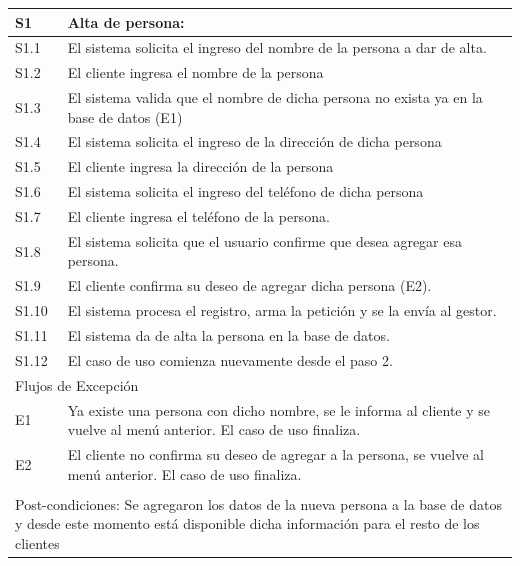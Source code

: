 \documentclass[11pt]{article}
\begin{document}
\begin{tabular}{|l|m{}|}
    S1 &  Alta de persona: \\ \hline
    S1.1 & El sistema solicita el ingreso del nombre de la persona a dar de alta.\\ \hline
    S1.2 & El cliente ingresa el nombre de la persona\\ \hline
    S1.3 & El sistema valida que el nombre de dicha persona no exista ya en la base de datos (E1) \\ \hline
    S1.4 & El sistema solicita el ingreso de la direcci\'on de dicha persona\\ \hline
    S1.5 & El cliente ingresa la direcci\'on de la persona\\ \hline
    S1.6 & El sistema solicita el ingreso del tel\'efono de dicha persona\\ \hline
    S1.7 & El cliente ingresa el tel\'efono de la persona.\\ \hline
    S1.8 & El sistema solicita que el usuario confirme que desea agregar esa persona.\\ \hline
    S1.9 & El cliente confirma su deseo de agregar dicha persona (E2).\\ \hline
    S1.10 & El sistema procesa el registro, arma la petici\'on y se la env\'ia al gestor.\\ \hline
    S1.11 & El sistema da de alta la persona en la base de datos.\\ \hline
    S1.12 & El caso de uso comienza nuevamente desde el paso 2.\\ \hline
    
    \multicolumn{2}{|l|}{Flujos de Excepción} \\
    \hline
  
    E1 & Ya existe una persona con dicho nombre, se le informa al cliente y se vuelve al men\'u anterior. 
    El caso de uso finaliza.\\
    E2 & El cliente no confirma su deseo de agregar a la persona, se vuelve al men\'u anterior. 
    El caso de uso finaliza.\\
    \hline
    \multicolumn{2}{|l|}{\rowcolor[gray]{.5}} \\
    \hline
  
    \multicolumn{2}{|m{0.9\textwidth}|}{Post-condiciones: Se agregaron los datos de la nueva persona a la base de datos
    y desde este momento est\'a disponible dicha informaci\'on para el resto de los clientes} \\
  
    \hline
  \end{tabular}
  \newline
\end{document}
